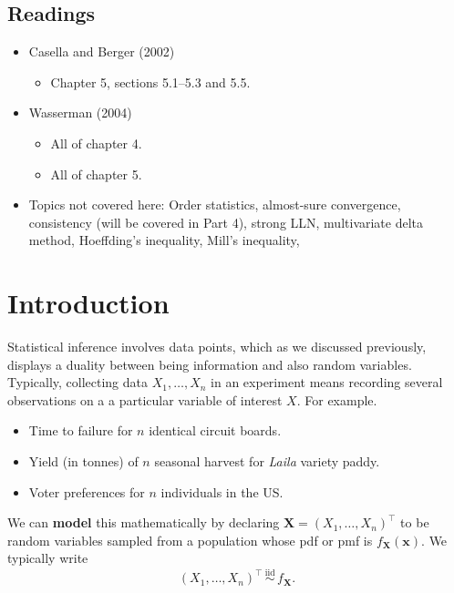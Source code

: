 \documentclass[
]{book}
\providecommand{\tightlist}{%
  \setlength{\itemsep}{0pt}\setlength{\parskip}{0pt}}
\newcommand{\bx}{{\boldsymbol x}}
\newcommand{\bX}{{\boldsymbol X}}
\newcommand{\iid}{\,\overset{\text{iid}}{\sim}\,}
\theoremstyle{definition}
\theoremstyle{definition}
\theoremstyle{definition}
\theoremstyle{definition}
\theoremstyle{remark}
\begin{document}
\hypertarget{readings-2}{%
\subsection*{Readings}\label{readings-2}}

\begin{itemize}
\tightlist
\item
  Casella and Berger (2002)

  \begin{itemize}
  \tightlist
  \item
    Chapter 5, sections 5.1--5.3 and 5.5.
  \end{itemize}
\item
  Wasserman (2004)

  \begin{itemize}
  \tightlist
  \item
    All of chapter 4.
  \item
    All of chapter 5.
  \end{itemize}
\item
  Topics not covered here: Order statistics, almost-sure convergence, consistency (will be covered in Part 4), strong LLN, multivariate delta method, Hoeffding's inequality, Mill's inequality,
\end{itemize}

\hypertarget{introduction}{%
\section{Introduction}\label{introduction}}

Statistical inference involves data points, which as we discussed previously, displays a duality between being information and also random variables.
Typically, collecting data \(X_1,\dots,X_n\) in an experiment means recording several observations on a a particular variable of interest \(X\).
For example.

\begin{itemize}
\tightlist
\item
  Time to failure for \(n\) identical circuit boards.
\item
  Yield (in tonnes) of \(n\) seasonal harvest for \emph{Laila} variety paddy.
\item
  Voter preferences for \(n\) individuals in the US.
\end{itemize}

We can \textbf{model} this mathematically by declaring \(\bX = (X_1,\dots,X_n)^\top\) to be random variables sampled from a population whose pdf or pmf is \(f_{\bX}(\bx)\).
We typically write
\[
(X_1,\dots,X_n)^\top \iid f_{\bX}.
\]
\end{document}
